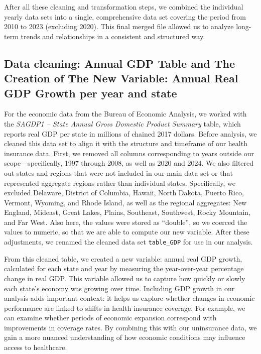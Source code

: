 \documentclass[
]{article}
\begin{document}
After all these cleaning and transformation steps, we combined the
individual yearly data sets into a single, comprehensive data set
covering the period from 2010 to 2023 (excluding 2020). This final
merged file allowed us to analyze long-term trends and relationships in
a consistent and structured way.

\subsection{Data cleaning: Annual GDP Table and The Creation of The New
Variable: Annual Real GDP Growth per year and
state}\label{data-cleaning-annual-gdp-table-and-the-creation-of-the-new-variable-annual-real-gdp-growth-per-year-and-state}

For the economic data from the Bureau of Economic Analysis, we worked
with the \emph{SAGDP1 -- State Annual Gross Domestic Product Summary}
table, which reports real GDP per state in millions of chained 2017
dollars. Before analysis, we cleaned this data set to align it with the
structure and timeframe of our health insurance data. First, we removed
all columns corresponding to years outside our scope---specifically,
1997 through 2008, as well as 2020 and 2024. We also filtered out states
and regions that were not included in our main data set or that
represented aggregate regions rather than individual states.
Specifically, we excluded Delaware, District of Columbia, Hawaii, North
Dakota, Puerto Rico, Vermont, Wyoming, and Rhode Island, as well as the
regional aggregates: New England, Mideast, Great Lakes, Plains,
Southeast, Southwest, Rocky Mountain, and Far West. Also here, the
values were stored as ``double'', so we coerced the values to numeric,
so that we are able to compute our new variable. After these
adjustments, we renamed the cleaned data set \texttt{table\_GDP} for use
in our analysis.

From this cleaned table, we created a new variable: annual real GDP
growth, calculated for each state and year by measuring the
year-over-year percentage change in real GDP. This variable allowed us
to capture how quickly or slowly each state's economy was growing over
time. Including GDP growth in our analysis adds important context: it
helps us explore whether changes in economic performance are linked to
shifts in health insurance coverage. For example, we can examine whether
periods of economic expansion correspond with improvements in coverage
rates. By combining this with our uninsurance data, we gain a more
nuanced understanding of how economic conditions may influence access to
healthcare.
\end{document}
